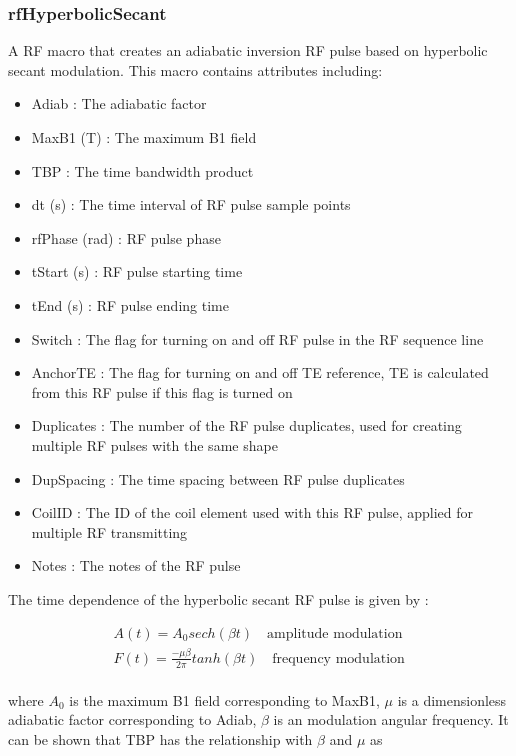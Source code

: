 \documentclass{book}%
\begin{document}
\subsubsection{rfHyperbolicSecant}

A RF macro that creates an adiabatic inversion RF pulse based on hyperbolic secant modulation. This macro contains attributes including:

\begin{itemize}
	\item Adiab : The adiabatic factor
	\item MaxB1 (T) : The maximum B1 field
	\item TBP : The time bandwidth product
	\item dt (s) : The time interval of RF pulse sample points
	\item rfPhase (rad) : RF pulse phase
	\item tStart (s) : RF pulse starting time
	\item tEnd (s) : RF pulse ending time
	\item Switch : The flag for turning on and off RF pulse in the RF sequence line
	\item AnchorTE : The flag for turning on and off TE reference, TE is calculated from this RF pulse if this flag is turned on
	\item Duplicates : The number of the RF pulse duplicates, used for creating multiple RF pulses with the same shape
	\item DupSpacing : The time spacing between RF pulse duplicates
	\item CoilID : The ID of the coil element used with this RF pulse, applied for multiple RF transmitting
	\item Notes : The notes of the RF pulse 
\end{itemize}

The time dependence of the hyperbolic secant RF pulse is given by \cite{Handbook2004}:

\begin{equation}\
\begin{aligned}
A(t) = A_0 sech(\beta t) \quad \text{amplitude modulation } \\
F(t) = \frac{-\mu \beta}{2 \pi} tanh(\beta t) \quad \text{frequency modulation } \\
\end{aligned}
\label{eq:HyperbolicSecant}
\end{equation}

where $A_0$ is the maximum B1 field corresponding to MaxB1, $\mu$ is a dimensionless adiabatic factor corresponding to Adiab, $\beta$ is an modulation angular frequency. It can be shown that TBP has the relationship with $\beta$ and $\mu$ as
\end{document}
